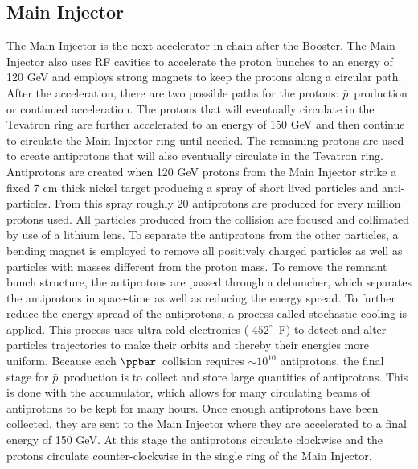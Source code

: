 \subsection{Main Injector}
The Main Injector is the next accelerator in chain after the Booster. The Main Injector also uses RF cavities to accelerate the proton bunches to an energy of 120 GeV and employs strong magnets to keep the protons along a circular path. After the acceleration, there are two possible paths for the protons: $\bar{p}$~production or continued acceleration. The protons that will eventually circulate in the Tevatron ring are further accelerated to an energy of 150 GeV and then continue to circulate the Main Injector ring until needed. The remaining protons are used to create antiprotons that will also eventually circulate in the Tevatron ring. Antiprotons are created when 120 GeV protons from the Main Injector strike a fixed 7 cm thick nickel target producing a spray of short lived particles and anti-particles. From this spray roughly 20 antiprotons are produced for every million protons used. All particles produced from the collision are focused and collimated by use of a lithium lens. To separate the antiprotons from the other particles, a bending magnet is employed to remove all positively charged particles as well as particles with masses different from the proton mass. To remove the remnant bunch structure, the antiprotons are passed through a debuncher, which separates the antiprotons in space-time as well as reducing the energy spread. To further reduce the energy spread of the antiprotons, a process called stochastic cooling is applied. This process uses ultra-cold electronics (-$452^{\circ}$~F) to detect and alter particles trajectories to make their orbits and thereby their energies more uniform. Because each $\ppbar$~collision requires $\sim10^{10}$ antiprotons, the final stage for $\bar{p}$~production is to collect and store large quantities of antiprotons. This is done with the accumulator, which allows for many circulating beams of antiprotons to be kept for many hours. Once enough antiprotons have been collected, they are sent to the Main Injector where they are accelerated to a final energy of 150 GeV. At this stage the antiprotons circulate clockwise and the protons circulate counter-clockwise in the single ring of the Main Injector.

